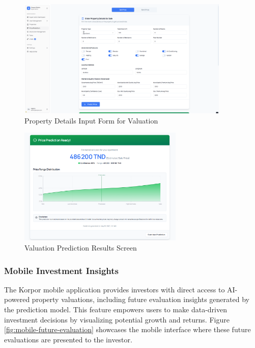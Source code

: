 \begin{figure}[htbp]
        \centering
        \includegraphics[width=0.9\textwidth]{images/screenshot_form_predition.png}
        \caption{Property Details Input Form for Valuation}
        \label{fig:prediction-form}
\end{figure}
\newpage
\begin{figure}[htbp]
        \centering
        \includegraphics[width=0.7\textwidth]{images/screenshot_predctionscreen.png}
        \caption{Valuation Prediction Results Screen}
        \label{fig:prediction-results}
\end{figure}

\subsubsection{Mobile Investment Insights}
The Korpor mobile application provides investors with direct access to AI-powered property valuations, including future evaluation insights generated by the prediction model. This feature empowers users to make data-driven investment decisions by visualizing potential growth and returns. Figure \ref{fig:mobile-future-evaluation} showcases the mobile interface where these future evaluations are presented to the investor.

